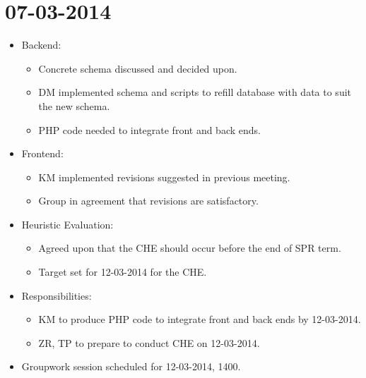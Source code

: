 \documentclass{article}
\begin{document}
\clearpage

\section*{07-03-2014}
\begin{itemize}
\item Backend:
  \begin{itemize}
  \item Concrete schema discussed and decided upon. 
  \item DM implemented schema and scripts to refill database with data to suit the new schema.
  \item PHP code needed to integrate front and back ends.
  \end{itemize}
\item Frontend: 
  \begin{itemize}
  \item KM implemented revisions suggested in previous meeting.
  \item Group in agreement that revisions are satisfactory.
  \end{itemize}
\item Heuristic Evaluation:
  \begin{itemize}
  \item Agreed upon that the CHE should occur before the end of SPR term.
  \item Target set for 12-03-2014 for the CHE.
  \end{itemize}
\item Responsibilities:
\begin{itemize}
\item KM to produce PHP code to integrate front and back ends by 12-03-2014.
\item ZR, TP to prepare to conduct CHE on 12-03-2014.
\end{itemize}
\item Groupwork session scheduled for 12-03-2014, 1400.
\end{itemize}
\end{document}
